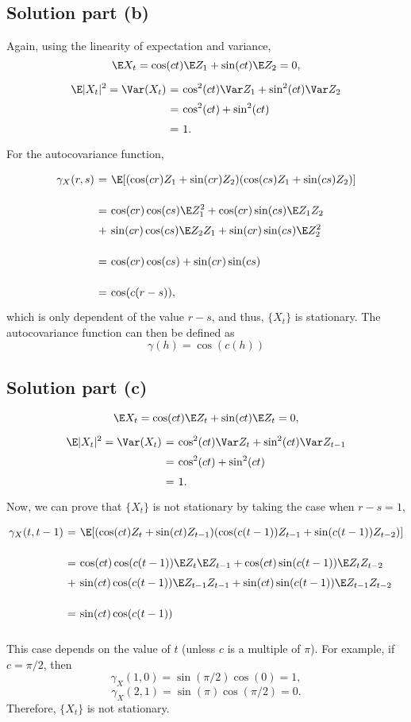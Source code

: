 \subsection*{Solution part (b)}

Again, using the linearity of expectation and variance,
\[ \E X_t = \cos(ct) \E Z_1 + \sin(ct) \E Z_2 = 0,\]
\[ \everymath{\displaystyle}
\arraycolsep=1.8pt\def\arraystretch{1.5}
\begin{array}{rcl}
    \E|X_t|^2 = \Var(X_t) & = & \cos^2(ct) \Var Z_1 + \sin^2(ct) \Var Z_2\\
    & = & \cos^2(ct) + \sin^2(ct)\\
    & = & 1.
\end{array} \]
For the autocovariance function,
\[ \everymath{\displaystyle}
\arraycolsep=1.8pt\def\arraystretch{1.5}
\begin{array}{rcl}
    \gamma_X(r,s) & = & \E[(\cos(cr) Z_1 + \sin(cr) Z_2) (\cos(cs) Z_1 + \sin(cs) Z_2)]\\[1em]
    & = & \cos(cr)\cos(cs)\E Z_1^2 + \cos(cr)\sin(cs)\E Z_1 Z_2\\
    & + & \sin(cr)\cos(cs)\E Z_2Z_1 + \sin(cr)\sin(cs)\E Z_2^2\\[1em]
    & = & \cos(cr)\cos(cs) + \sin(cr)\sin(cs)\\[1em]
    & = & \cos(c(r-s)),
\end{array} \]
which is only dependent of the value $r-s$, and thus, $\{X_t\}$ is stationary. The autocovariance function can then be defined as
\[ \gamma(h) = \cos(c(h)) \]

\subsection*{Solution part (c)}
\[ \E X_t = \cos(ct) \E Z_t + \sin(ct) \E Z_t = 0,\]
\[ \everymath{\displaystyle}
\arraycolsep=1.8pt\def\arraystretch{1.5}
\begin{array}{rcl}
    \E|X_t|^2 = \Var(X_t) & = & \cos^2(ct) \Var Z_t + \sin^2(ct) \Var Z_{t-1}\\
    & = & \cos^2(ct) + \sin^2(ct)\\
    & = & 1.
\end{array} \]
Now, we can prove that $\{X_t\}$ is not stationary by taking the case when $r-s = 1$,
\[ \everymath{\displaystyle}
\arraycolsep=1.8pt\def\arraystretch{1.5}
\begin{array}{rcl}
    \gamma_X(t,t-1) & = & \E[(\cos(ct) Z_t + \sin(ct) Z_{t-1}) (\cos(c(t-1)) Z_{t-1} + \sin(c(t-1)) Z_{t-2})]\\[1em]
    & = & \cos(ct)\cos(c(t-1)) \E Z_t \E Z_{t-1} + \cos(ct)\sin(c(t-1))\E Z_{t} Z_{t-2}\\
    & + & \sin(ct)\cos(c(t-1))\E Z_{t-1}Z_{t-1} + \sin(ct)\sin(c(t-1))\E Z_{t-1}Z_{t-2}\\[1em]
    & = & \sin(ct)\cos(c(t-1))\\[1em]
\end{array} \]
This case depends on the value of $t$ (unless $c$ is a multiple of $\pi$). For example, if $c = \pi/2$, then
\[ \gamma_X(1,0) = \sin(\pi/2)\cos(0) = 1, \]
\[ \gamma_X(2,1) = \sin(\pi)\cos(\pi/2) = 0.\]
Therefore, $\{X_t\}$ is not stationary.